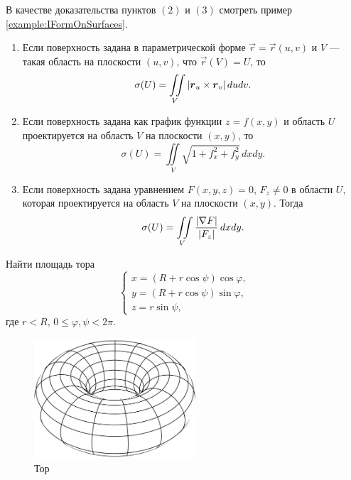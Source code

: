 \begin{example} В качестве доказательства пунктов $(2)$ и $(3)$ смотреть пример \ref{example:IFormOnSurfaces}.
	\begin{enumerate}[nolistsep, label=(\arabic*)]
		\item Если поверхность задана в параметрической форме $\vec{r} = \vec{r}(u, v)$ и $V$ --- такая область на плоскости $(u, v)$, что $\vec{r}(V) = U$, то
			\[
				\sigma(U) = \iint\limits_{V}\left\lvert\boldsymbol{r}_u \times \boldsymbol{r}_v\right\rvert dudv.
			\]
		\item Если поверхность задана как график функции $z = f(x, y)$ и область $U$ проектируется на область $V$ на плоскости $(x, y)$, то
			\[
				\sigma(U) = \iint\limits_{V}\sqrt{1 + f_x^2 + f_y^2}\,dxdy.
			\]
		\item Если поверхность задана уравнением $F(x, y, z) = 0$, $F_z \ne 0$ в области $U$, которая проектируется на область $V$ на плоскости $(x, y)$. Тогда
			\[
				\sigma(U) = \iint\limits_{V}\frac{\left\lvert\nabla F\right\rvert}{\left\lvert F_z\right\rvert}\,dxdy.
			\]
	\end{enumerate}
\end{example}

\begin{problem}
	Найти площадь тора
	\[
		\begin{cases}
			x = (R + r\cos\psi)\cos\varphi,\\
			y = (R + r\cos\psi)\sin\varphi,\\
			z = r\sin\psi,
		\end{cases}
	\]
	где $r < R$, $0 \leqslant \varphi, \psi < 2\pi$.
\end{problem}

\begin{figure}[H]
	\centering
	\includegraphics[width=6cm]{./img/Torus.pdf}
	\caption{Тор}
\end{figure}

